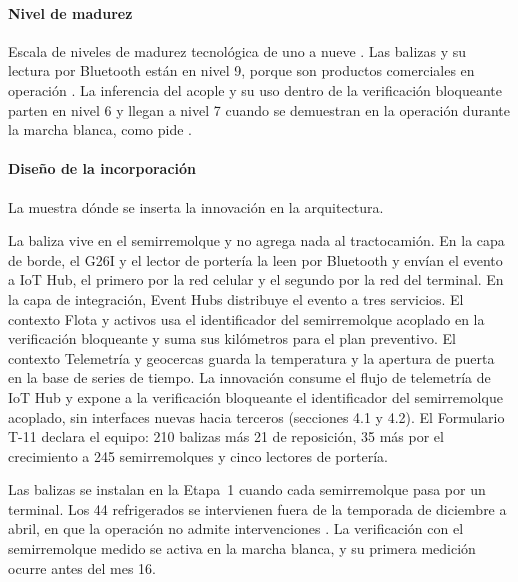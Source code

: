 \paragraph{Nivel de madurez} Escala de niveles de madurez tecnológica de uno a nueve
\parencite{iso16290}. Las balizas y su lectura por Bluetooth están en nivel 9, porque son productos
comerciales en operación \parencite{teltonika_eye,minew_g1}. La inferencia del acople y su uso dentro
de la verificación bloqueante parten en nivel 6 y llegan a nivel 7 cuando se demuestran en la operación
durante la marcha blanca, como pide .

\paragraph{Diseño de la incorporación} La  muestra dónde se inserta la
innovación en la arquitectura.


La baliza vive en el semirremolque y no agrega nada al tractocamión. En la capa de borde, el G26I y el
lector de portería la leen por Bluetooth y envían el evento a IoT Hub, el primero por la red celular y
el segundo por la red del terminal. En la capa de integración, Event Hubs distribuye el evento a tres
servicios. El contexto Flota y activos usa el identificador del semirremolque acoplado en la
verificación bloqueante y suma sus kilómetros para el plan preventivo. El contexto Telemetría y
geocercas guarda la temperatura y la apertura de puerta en la base de series de tiempo. La innovación
consume el flujo de telemetría de IoT Hub y expone a la verificación bloqueante el identificador del
semirremolque acoplado, sin interfaces nuevas hacia terceros (secciones 4.1 y 4.2). El Formulario T-11
declara el equipo: 210 balizas más 21 de reposición, 35 más por el crecimiento a 245 semirremolques y
cinco lectores de portería.

Las balizas se instalan en la Etapa~1 cuando cada semirremolque pasa por un terminal. Los 44
refrigerados se intervienen fuera de la temporada de diciembre a abril, en que la operación no admite
intervenciones . La verificación con el semirremolque medido se activa en la
marcha blanca, y su primera medición ocurre antes del mes 16.


